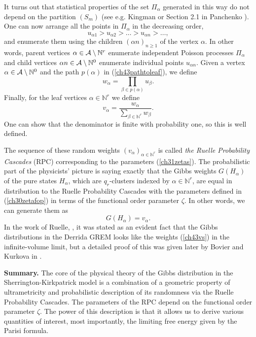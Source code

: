 \documentclass[12pt]{article}
\newcommand{\A}{{\cal A}}
\newcommand{\Natural}{\mathbb{N}}
\theoremstyle{nonumberplain}
\begin{document}
\medskip
\noindent
It turns out that statistical properties of the set $\Pi_\alpha$ generated in this way do not depend on the partition $(S_m)$ (see e.g. Kingman \cite{king} or Section 2.1 in Panchenko \cite{SKmodel}). One can now arrange all the points in $\Pi_\alpha$ in the decreasing order,
\begin{equation}
u_{\alpha 1} > u_{ \alpha 2} >\ldots >u_{\alpha n} > \ldots,
\label{ch43us}
\end{equation}
and enumerate them using the children $(\alpha n)_{n\geq 1}$ of the vertex $\alpha$. In other words, parent vertices $\alpha \in \A \setminus \Natural^r$ enumerate independent Poisson processes $\Pi_\alpha$ and child vertices $\alpha n\in \A\setminus \Natural^0$ enumerate individual points $u_{\alpha n}$. Given a vertex $\alpha\in \A\setminus \Natural^0$ and the path $p(\alpha)$ in (\ref{ch43pathtoleaf}), we define
\begin{equation}
w_\alpha = \prod_{\beta \in p(\alpha)} u_{\beta}.
\label{ch43ws}
\end{equation}
Finally, for the leaf vertices $\alpha \in \Natural^r$ we define
\begin{equation}
v_\alpha = \frac{w_\alpha}{\sum_{\beta\in \Natural^r} w_\beta}.
\label{ch43vs}
\end{equation}
One can show that the denominator is finite with probability one, so this is well defined. 

The sequence of these random weights $(v_\alpha)_{\alpha\in \Natural^r}$ is called \emph{the Ruelle Probability Cascades} (RPC) corresponding to the parameters (\ref{ch31zetas}). The probabilistic part of the physicists' picture is saying exactly that the Gibbs weights $G(H_\alpha)$ of the pure states $H_\alpha$, which are $q_r$-clusters indexed by $\alpha\in\Natural^r$, are equal in distribution to the Ruelle Probability Cascades with the parameters defined  in (\ref{ch30zetafop}) in  terms of the functional order parameter $\zeta$. In other words, we can generate them as
\begin{equation}
G(H_\alpha) = v_\alpha.
\end{equation}
In the work of Ruelle, \cite{Ruelle}, it was stated as an evident fact that the Gibbs distributions in the Derrida GREM looks like the weights (\ref{ch43vs}) in the infinite-volume limit, but a detailed proof of this was given later by Bovier and Kurkova in \cite{Bovier}. 

\noindent
\textbf{Summary.}  The core of the physical theory of the Gibbs distribution in the Sherrington-Kirkpatrick model is a combination of a geometric property of ultrametricity and probabilistic description of its randomness via the Ruelle Probability Cascades. The parameters of the RPC depend on the functional order parameter $\zeta$. The power of this description is that it allows us to derive various quantities of interest, most importantly, the limiting free energy given by the Parisi formula. 
\end{document}
